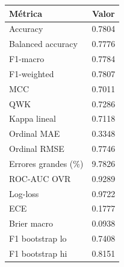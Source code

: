 \begin{tabular}{lc}
\toprule
Métrica & Valor \\
\midrule
Accuracy & 0.7804 \\
Balanced accuracy & 0.7776 \\
F1-macro & 0.7784 \\
F1-weighted & 0.7807 \\
MCC & 0.7011 \\
QWK & 0.7286 \\
Kappa lineal & 0.7118 \\
Ordinal MAE & 0.3348 \\
Ordinal RMSE & 0.7746 \\
Errores grandes (\%) & 9.7826 \\
ROC-AUC OVR & 0.9289 \\
Log-loss & 0.9722 \\
ECE & 0.1777 \\
Brier macro & 0.0938 \\
F1 bootstrap lo & 0.7408 \\
F1 bootstrap hi & 0.8151 \\
\bottomrule
\end{tabular}
